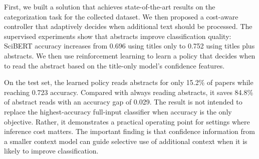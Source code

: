 \documentclass{article}
\begin{document}
First, we built a solution that achieves state-of-the-art results on the categorization task for the collected dataset. We then proposed a cost-aware controller that adaptively decides when additional text should be processed. The supervised experiments show that abstracts improve classification quality: SciBERT accuracy increases from 0.696 using titles only to 0.752 using titles plus abstracts. We then use reinforcement learning to learn a policy that decides when to read the abstract based on the title-only model’s confidence features.

On the test set, the learned policy reads abstracts for only 15.2\% of papers while reaching 0.723 accuracy. Compared with always reading abstracts, it saves 84.8\% of abstract reads with an accuracy gap of 0.029. The result is not intended to replace the highest-accuracy full-input classifier when accuracy is the only objective. Rather, it demonstrates a practical operating point for settings where inference cost matters. The important finding is that confidence information from a smaller context model can guide selective use of additional context when it is likely to improve classification.




\end{document}
